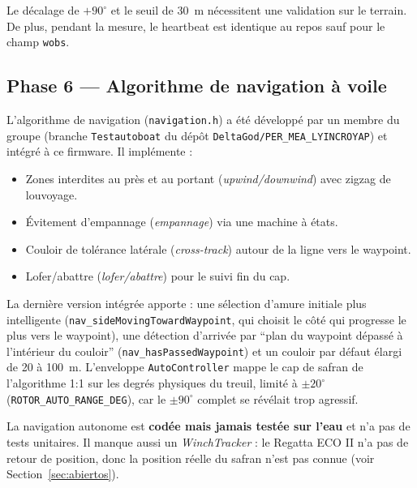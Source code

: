 \documentclass[12pt,a4paper]{article}
\newcommand{\file}[1]{\texttt{#1}}
\begin{document}
\begin{warningbox}
  Le d\'ecalage de $+90^{\circ}$ et le seuil de 30~m n\'ecessitent une validation sur
  le terrain. De plus, pendant la mesure, le heartbeat est identique au repos sauf
  pour le champ \texttt{wobs}.
\end{warningbox}

\subsection{Phase 6 --- Algorithme de navigation à voile}

L'algorithme de navigation (\file{navigation.h}) a \'et\'e d\'evelopp\'e par un membre
du groupe (branche \texttt{Testautoboat} du d\'ep\^ot
\texttt{DeltaGod/PER\_MEA\_LYINCROYAP}) et int\'egr\'e à ce firmware. Il impl\'emente :

\begin{itemize}
  \item Zones interdites au pr\`es et au portant (\emph{upwind/downwind}) avec zigzag
    de louvoyage.
  \item \'Evitement d'empannage (\emph{empannage}) via une machine à \'etats.
  \item Couloir de tol\'erance lat\'erale (\emph{cross-track}) autour de la ligne vers
    le waypoint.
  \item Lofer/abattre (\emph{lofer/abattre}) pour le suivi fin du cap.
\end{itemize}

La derni\`ere version int\'egr\'ee apporte : une s\'election d'amure initiale plus
intelligente (\texttt{nav\_sideMovingTowardWaypoint}, qui choisit le c\^ot\'e qui
progresse le plus vers le waypoint), une d\'etection d'arriv\'ee par ``plan du
waypoint d\'epass\'e à l'int\'erieur du couloir'' (\texttt{nav\_hasPassedWaypoint}) et
un couloir par d\'efaut \'elargi de 20 à 100~m. L'enveloppe \file{AutoController}
mappe le cap de safran de l'algorithme 1:1 sur les degr\'es physiques du treuil,
limit\'e à $\pm20^{\circ}$ (\texttt{ROTOR\_AUTO\_RANGE\_DEG}), car le $\pm90^{\circ}$
complet se r\'ev\'elait trop agressif.

\begin{warningbox}
  La navigation autonome est \textbf{cod\'ee mais jamais test\'ee sur l'eau} et n'a
  pas de tests unitaires. Il manque aussi un \emph{WinchTracker} : le Regatta ECO II
  n'a pas de retour de position, donc la position r\'eelle du safran n'est pas connue
  (voir Section~\ref{sec:abiertos}).
\end{warningbox}
\end{document}
